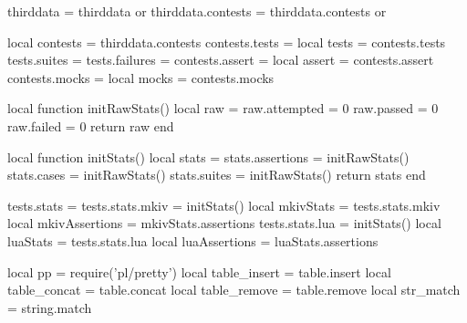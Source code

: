 thirddata          = thirddata          or {}
thirddata.contests = thirddata.contests or {}

local contests  = thirddata.contests
contests.tests  = {}
local tests     = contests.tests
tests.suites    = {}
tests.failures  = {}
contests.assert = {}
local assert    = contests.assert
contests.mocks  = {}
local mocks     = contests.mocks

local function initRawStats()
  local raw = {}
  raw.attempted  = 0
  raw.passed     = 0
  raw.failed     = 0
  return raw
end

local function initStats()
  local stats = {}
  stats.assertions = initRawStats()
  stats.cases      = initRawStats()
  stats.suites     = initRawStats()
  return stats
end

tests.stats          = {}
tests.stats.mkiv     = initStats()
local mkivStats      = tests.stats.mkiv
local mkivAssertions = mkivStats.assertions
tests.stats.lua      = initStats()
local luaStats       = tests.stats.lua
local luaAssertions  = luaStats.assertions

local pp = require('pl/pretty')
local table_insert = table.insert
local table_concat = table.concat
local table_remove = table.remove
local str_match    = string.match

\stopLuaCode

\stopchapter